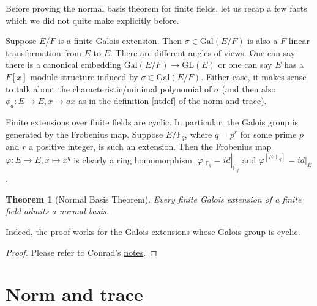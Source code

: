 \documentclass[12pt]{report}
\newtheorem{theorem}{Theorem}[section]
\theoremstyle{definition}
\newtheorem{example}[theorem]{Example}
\newcommand{\gal}{\text{Gal}}
\newcommand{\zz}{\mathbb{Z}}
\newcommand{\ff}{\mathbb{F}}
\newcommand{\qq}{\mathbb{Q}}
\begin{document}
Before proving the normal basis theorem for finite fields, let us recap a few facts which we did not quite make explicitly before.

Suppose $E/F$ is a finite Galois extension. Then $\sigma\in\gal(E/F)$ is also a $F$-linear transformation from $E$ to $E$. There are different angles of views. One can say there is a canonical embedding $\gal(E/F)\to \mbox{GL}(E)$ or one can say $E$ has a $F[x]$-module structure induced by $\sigma\in \gal(E/F)$. Either case, it makes sense to talk about the characteristic/minimal polynomial of $\sigma$ (and then also $\phi_a: E\to E, x\to ax$ as in the definition \ref{ntdef} of the norm and trace).

Finite extensions over finite fields are cyclic. In particular, the Galois group is generated by the Frobenius map. Suppose $E/\ff_q$, where $q=p^r$ for some prime $p$ and $r$ a positive integer, is such an extension. Then the Frobenius map $\varphi: E\to E, x\mapsto x^q$ is clearly a ring homomorphism. $\varphi|_{\ff_q}=id|_{\ff_q}$ and $\varphi^{[E:\ff_{q}]}=id|_{E}$.

\begin{theorem}[Normal Basis Theorem]
	Every finite Galois extension of a finite field admits a normal basis.
\end{theorem}

Indeed, the proof works for the Galois extensions whose Galois group is cyclic.

\begin{proof}
	Please refer to Conrad's \href{https://kconrad.math.uconn.edu/blurbs/galoistheory/linearchar.pdf}{notes}.
\end{proof}


\section{Norm and trace}
\end{document}
